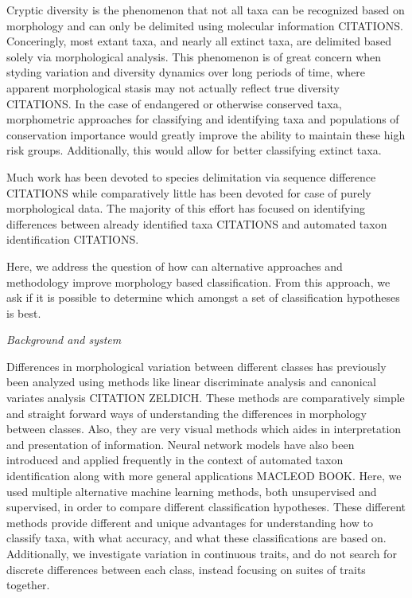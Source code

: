 \documentclass[12pt,letterpaper]{article}\usepackage{graphicx, color}
\renewcommand{\section}[1]{%
\bigskip
\begin{center}
\begin{Large}
\normalfont\scshape #1
\medskip
\end{Large}
\end{center}}
\renewcommand{\subsection}[1]{%
\bigskip
\begin{center}
\begin{large}
\normalfont\itshape #1
\end{large}
\end{center}}
\begin{document}

Cryptic diversity is the phenomenon that not all taxa can be recognized based on morphology and can only be delimited using molecular information CITATIONS. Conceringly, most extant taxa, and nearly all extinct taxa, are delimited based solely via morphological analysis. This phenomenon is of great concern when styding variation and diversity dynamics over long periods of time, where apparent morphological stasis may not actually reflect true diversity CITATIONS. In the case of endangered or otherwise conserved taxa, morphometric approaches for classifying and identifying taxa and populations of conservation importance would greatly improve the ability to maintain these high risk groups. Additionally, this would allow for better classifying extinct taxa.

Much work has been devoted to species delimitation via sequence difference CITATIONS while comparatively little has been devoted for case of purely morphological data. The majority of this effort has focused on identifying differences between already identified taxa CITATIONS and automated taxon identification CITATIONS.

Here, we address the question of how can alternative approaches and methodology improve morphology based classification. From this approach, we ask if it is possible to determine which amongst a set of classification hypotheses is best.

\subsection{Background and system}
Differences in morphological variation between different classes has previously been analyzed using methods like linear discriminate analysis and canonical variates analysis CITATION ZELDICH. These methods are comparatively simple and straight forward ways of understanding the differences in morphology between classes. Also, they are very visual methods which aides in interpretation and presentation of information. Neural network models have also been introduced and applied frequently in the context of automated taxon identification along with more general applications MACLEOD BOOK. Here, we used multiple alternative machine learning methods, both unsupervised and supervised, in order to compare different classification hypotheses. These different methods provide different and unique advantages for understanding how to classify taxa, with what accuracy, and what these classifications are based on. Additionally, we investigate variation in continuous traits, and do not search for discrete differences between each class, instead focusing on suites of traits together.
\end{document}
